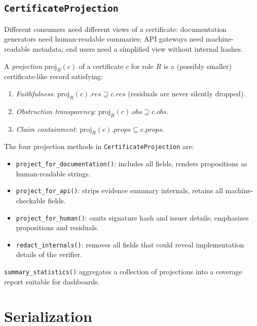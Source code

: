\documentclass[11pt]{article}
\newcommand{\certprops}{\mathit{props}}        %
\newcommand{\certresid}{\mathit{res}}          %
\newcommand{\certobstr}{\mathit{obs}}          %
\newcommand{\proj}{\mathrm{proj}}              %
\begin{document}
\subsection{\texttt{CertificateProjection}}

Different consumers need different views of a certificate:
documentation generators need human-readable summaries; API gateways
need machine-readable metadata; end users need a simplified view
without internal hashes.

\begin{definition}[Projection]\label{def:proj}
A \emph{projection} $\proj_R(c)$ of a certificate $c$ for role $R$
is a (possibly smaller) certificate-like record satisfying:
\begin{enumerate}
  \item \emph{Faithfulness}: $\proj_R(c).\certresid \supseteq c.\certresid$
        (residuals are never silently dropped).
  \item \emph{Obstruction transparency}: $\proj_R(c).\certobstr \supseteq c.\certobstr$.
  \item \emph{Claim containment}: $\proj_R(c).\certprops \subseteq c.\certprops$.
\end{enumerate}
\end{definition}

The four projection methods in \texttt{CertificateProjection} are:
\begin{itemize}
  \item \texttt{project\_for\_documentation()}: includes all fields,
        renders propositions as human-readable strings.
  \item \texttt{project\_for\_api()}: strips evidence summary internals,
        retains all machine-checkable fields.
  \item \texttt{project\_for\_human()}: omits signature hash and issuer
        details; emphasizes propositions and residuals.
  \item \texttt{redact\_internals()}: removes all fields that could
        reveal implementation details of the verifier.
\end{itemize}

\texttt{summary\_statistics()} aggregates a collection of projections
into a coverage report suitable for dashboards.

\section{Serialization}\label{sec:serial}
\end{document}
